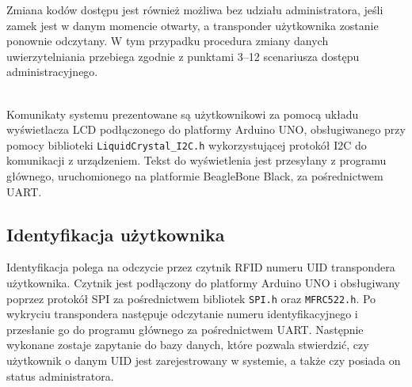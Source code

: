 \documentclass[polish,polish,a4paper]{article}
\begin{document}
	Zmiana kodów dostępu jest również możliwa bez udziału administratora, jeśli zamek jest w danym momencie otwarty, a transponder użytkownika zostanie ponownie odczytany. W tym przypadku procedura zmiany danych uwierzytelniania przebiega zgodnie z punktami 3--12 scenariusza dostępu administracyjnego.
	
	\noindent\\
	Komunikaty systemu prezentowane są użytkownikowi za pomocą układu wyświetlacza LCD podłączonego do platformy Arduino UNO, obsługiwanego przy pomocy biblioteki \verb|LiquidCrystal_I2C.h| wykorzystującej protokół I2C do komunikacji z urządzeniem. Tekst do wyświetlenia jest przesyłany z programu głównego, uruchomionego na platformie BeagleBone Black, za pośrednictwem UART.
	
	\subsection{Identyfikacja użytkownika}
	Identyfikacja polega na odczycie przez czytnik RFID numeru UID transpondera użytkownika. Czytnik jest podłączony do platformy Arduino UNO i obsługiwany poprzez protokół SPI za pośrednictwem bibliotek \verb|SPI.h| oraz \verb|MFRC522.h|. Po wykryciu transpondera następuje odczytanie numeru identyfikacyjnego i przesłanie go do programu głównego za pośrednictwem UART. Następnie wykonane zostaje zapytanie do bazy danych, które pozwala stwierdzić, czy użytkownik o danym UID jest zarejestrowany w systemie, a także czy posiada on status administratora.
	
\end{document}
